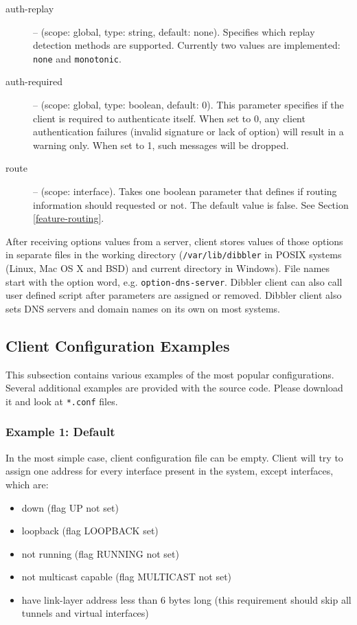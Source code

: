 \begin{description}
\item[auth-replay] -- (scope: global, type: string, default:
  none). Specifies which replay detection methods are
  supported. Currently two values are implemented: \texttt{none} and
  \texttt{monotonic}.

\item[auth-required] -- (scope: global, type: boolean, default:
  0). This parameter specifies if the client is required to
  authenticate itself. When set to 0, any client authentication
  failures (invalid signature or lack of  option) will
  result in a warning only. When set to 1, such messages will be
  dropped.

 \item[route] -- (scope: interface). Takes one boolean parameter that
 defines if routing information should requested or not. The default
 value is false. See Section \ref{feature-routing}.

\end{description}

After receiving options values from a server, client stores values of
those options in separate files in the working directory
(\verb+/var/lib/dibbler+ in POSIX systems (Linux, Mac OS X and BSD)
and current directory in Windows). File names start with the option
word, e.g. \verb+option-dns-server+. Dibbler client can also call user
defined script after parameters are assigned or removed. Dibbler
client also sets DNS servers and domain names on its own on most
systems.

\subsection{Client Configuration Examples}
This subsection contains various examples of the most popular
configurations. Several additional examples are provided with the source
code. Please download it and look at \verb+*.conf+ files.

\subsubsection{Example 1: Default}
In the most simple case, client configuration file can be empty. Client will try to
assign one address for every interface present in the system, except
interfaces, which are:
\begin{itemize}
\item down (flag UP not set)
\item loopback (flag LOOPBACK set)
\item not running (flag RUNNING not set)
\item not multicast capable (flag MULTICAST not set)
\item have link-layer address less than 6 bytes long (this requirement
      should skip all tunnels and virtual interfaces)
\end{itemize}


